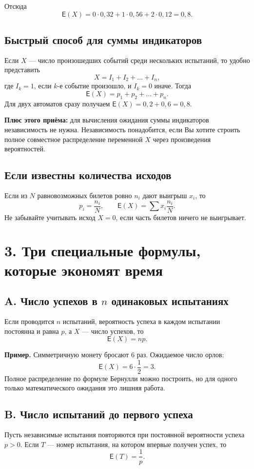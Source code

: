 \documentclass[a4paper,12pt]{article}
\newcommand{\E}{\mathsf{E}}
\newcommand{\sectionline}{\par\vspace{0.2em}{\color{accent}\hrule height 0.6pt}\vspace{0.5em}}
\newcommand{\Key}[1]{\textbf{\color{darkaccent}#1}}
\begin{document}
Отсюда
\[
\E(X)=0\cdot0{,}32+1\cdot0{,}56+2\cdot0{,}12=0{,}8.
\]

\subsection*{Быстрый способ для суммы индикаторов}
Если $X$ --- число произошедших событий среди нескольких испытаний, то удобно представить
\[
X=I_1+I_2+\dots+I_n,
\]
где $I_k=1$, если $k$-е событие произошло, и $I_k=0$ иначе. Тогда
\[
\boxed{\E(X)=p_1+p_2+\dots+p_n.}
\]
Для двух автоматов сразу получаем $\E(X)=0{,}2+0{,}6=0{,}8$.

\Key{Плюс этого приёма:} для вычисления ожидания суммы индикаторов независимость не нужна. Независимость понадобится, если Вы хотите строить полное совместное распределение переменной $X$ через произведения вероятностей.

\subsection*{Если известны количества исходов}
Если из $N$ равновозможных билетов ровно $n_i$ дают выигрыш $x_i$, то
\[
p_i=\frac{n_i}{N},\qquad \E(X)=\sum x_i\frac{n_i}{N}.
\]
Не забывайте учитывать исход $X=0$, если часть билетов ничего не выигрывает.

\clearpage

\begingroup
{}
\setlength{\parskip}{0.12em}
\section*{3. Три специальные формулы, которые экономят время}
\sectionline

\subsection*{A. Число успехов в $n$ одинаковых испытаниях}
Если проводится $n$ испытаний, вероятность успеха в каждом испытании постоянна и равна $p$, а $X$ --- число успехов, то
\[
\boxed{\E(X)=np.}
\]

\Key{Пример.} Симметричную монету бросают $6$ раз. Ожидаемое число орлов:
\[
\E(X)=6\cdot\frac12=3.
\]
Полное распределение по формуле Бернулли можно построить, но для одного только математического ожидания это лишняя работа.

\subsection*{B. Число испытаний до первого успеха}
Пусть независимые испытания повторяются при постоянной вероятности успеха $p>0$. Если $T$ --- номер испытания, на котором впервые получен успех, то
\[
\boxed{\E(T)=\frac{1}{p}.}
\]
\end{document}
